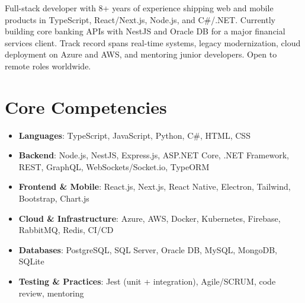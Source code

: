 \documentclass[11pt,a4paper,sans]{moderncv}
\begin{document}
\makecvtitle


\vspace{6pt}
\small{Full-stack developer with 8+ years of experience shipping web and mobile products in TypeScript, React/Next.js, Node.js, and C\#/.NET. Currently building core banking APIs with NestJS and Oracle DB for a major financial services client. Track record spans real-time systems, legacy modernization, cloud deployment on Azure and AWS, and mentoring junior developers. Open to remote roles worldwide.}


\section{Core Competencies}
\vspace{1pt}
\begin{itemize}

\item \textbf{Languages}: TypeScript, JavaScript, Python, C\#, HTML, CSS

\item \textbf{Backend}: Node.js, NestJS, Express.js, ASP.NET Core, .NET Framework, REST, GraphQL, WebSockets/Socket.io, TypeORM

\item \textbf{Frontend \& Mobile}: React.js, Next.js, React Native, Electron, Tailwind, Bootstrap, Chart.js

\item \textbf{Cloud \& Infrastructure}: Azure, AWS, Docker, Kubernetes, Firebase, RabbitMQ, Redis, CI/CD

\item \textbf{Databases}: PostgreSQL, SQL Server, Oracle DB, MySQL, MongoDB, SQLite

\item \textbf{Testing \& Practices}: Jest (unit + integration), Agile/SCRUM, code review, mentoring

\end{itemize}

\end{document}
